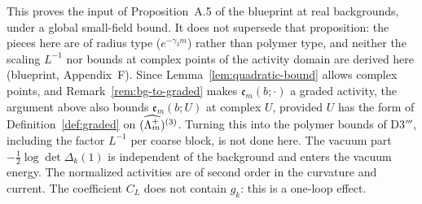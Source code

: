 This proves the input of Proposition~A.5 of the blueprint at real backgrounds, under a global small-field bound. It does not supersede that proposition: the pieces here are of radius type ($e^{-\gamma_3m}$) rather than polymer type, and neither the scaling $L^{-1}$ nor bounds at complex points of the activity domain are derived here (blueprint, Appendix~F). Since Lemma~\ref{lem:quadratic-bound} allows complex points, and Remark~\ref{rem:bg-to-graded} makes $\mathfrak e_m(b;\cdot)$ a graded activity, the argument above also bounds $\mathfrak e_m(b;U)$ at complex $U$, provided $U$ has the form of Definition~\ref{def:graded} on $(\widehat{\Lambda_m^+})^{(3)}$. Turning this into the polymer bounds of D3$'''$, including the factor $L^{-1}$ per coarse block, is not done here. The vacuum part $-\frac12\log\det\Delta_k(1)$ is independent of the background and enters the vacuum energy. The normalized activities are of second order in the curvature and current. The coefficient $C_L$ does not contain $g_k$: this is a one-loop effect.
